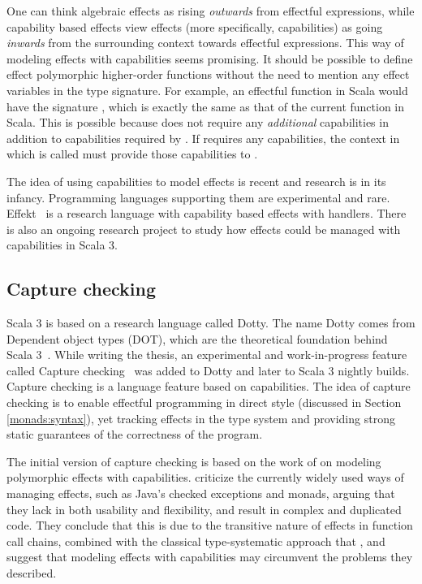 One can think algebraic effects as rising \emph{outwards} from effectful expressions, while capability based effects view effects (more specifically, capabilities) as going \emph{inwards} from the surrounding context towards effectful expressions. This way of modeling effects with capabilities seems promising. It should be possible to define effect polymorphic higher-order functions without the need to mention any effect variables in the type signature. For example, an effectful  function in Scala would have the signature , which is exactly the same as that of the current  function in Scala. This is possible because  does not require any \emph{additional} capabilities in addition to capabilities required by . If  requires any capabilities, the context in which  is called must provide those capabilities to .~\cite{scoped-capabilities}

The idea of using capabilities to model effects is recent and research is in its infancy. Programming languages supporting them are experimental and rare. Effekt~\cite{effekt-lang} is a research language with capability based effects with handlers. There is also an ongoing research project to study how effects could be managed with capabilities in Scala 3.


\subsection{Capture checking}\label{capabilities:capture-checking}
Scala 3 is based on a research language called Dotty. The name Dotty comes from Dependent object types (DOT), which are the theoretical foundation behind Scala 3~\cite{essence-of-dot}. While writing the thesis, an experimental and work-in-progress feature called Capture checking~\cite{capture-checking} was added to Dotty and later to Scala 3 nightly builds. Capture checking is a language feature based on capabilities. The idea of capture checking is to enable effectful programming in direct style (discussed in Section \ref{monads:syntax}), yet tracking effects in the type system and providing strong static guarantees of the correctness of the program.

The initial version of capture checking is based on the work of \textcite{scoped-capabilities} on modeling polymorphic effects with capabilities. \citeauthor{scoped-capabilities} criticize the currently widely used ways of managing effects, such as Java's checked exceptions and monads, arguing that they lack in both usability and flexibility, and result in complex and duplicated code. They conclude that this is due to the transitive nature of effects in function call chains, combined with the classical type-systematic approach that , and suggest that modeling effects with capabilities may circumvent the problems they described.

